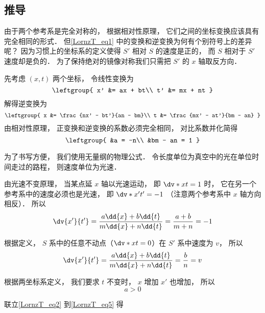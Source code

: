\subsection{推导}
由于两个参考系是完全对称的， 根据相对性原理， 它们之间的坐标变换应该具有完全相同的形式． 但\autoref{LornzT_eq1} 中的变换和逆变换为何有个别符号上的差异呢？ 因为习惯上的坐标系的定义使得 $S'$ 相对 $S$ 的速度是正的， 而 $S$ 相对于 $S'$ 速度却是负的． 为了保持绝对的镜像对称我们只需把 $S'$ 的 $x$ 轴取反方向．

先考虑 $(x, t)$ 两个坐标， 令线性变换为
\begin{equation}
\leftgroup{
x' &= ax + bt\\
t' &= mx + nt
}
\end{equation}
解得逆变换为
\begin{equation}
\leftgroup{
x &= \frac{nx' - bt'}{an - bm}\\
t &= \frac{mx' - at'}{bm - an}
}
\end{equation}
由相对性原理， 正变换和逆变换的系数必须完全相同， 对比系数并化简得
\begin{equation}\label{LornzT_eq2}
\leftgroup{
&a = -n\\
&bm - an = 1
}
\end{equation}

为了书写方便， 我们使用无量纲的物理公式． 令长度单位为真空中的光在单位时间走过的路程， 则速度单位为光速．

由光速不变原理， 当某点延 $x$ 轴以光速运动， 即 $\dv*{x}{t} = 1$ 时， 它在另一个参考系中的速度必须也是光速， 即 $\dv*{x'}{t'} = -1$ （注意两个参考系中 $x$ 轴方向相反）． 所以
\begin{equation}\label{LornzT_eq3}
\dv{x'}{t'} = \frac{a\dd{x} + b\dd{t}}{m\dd{x} + n\dd{t}} = \frac{a + b}{m + n} = -1
\end{equation}

根据定义， $S$ 系中的任意不动点（$\dv*{x}{t} = 0$）在 $S'$ 系中速度为 $v$， 所以
\begin{equation}\label{LornzT_eq4}
\dv{x'}{t'} = \frac{a\dd{x} + b\dd{t}}{m\dd{x} + n\dd{t}} = \frac{b}{n} = v
\end{equation}

根据两坐标系定义， 我们要求 $t$ 不变时， $x$ 增加 $x'$ 也增加， 所以
\begin{equation}\label{LornzT_eq5}
a > 0
\end{equation}

联立\autoref{LornzT_eq2} 到\autoref{LornzT_eq5} 得




